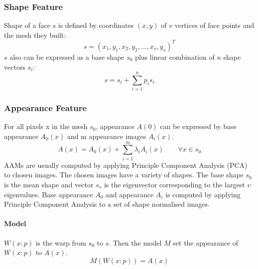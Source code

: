 \subsubsection{Shape Feature}
Shape of a face $s$ is defined by coordinates $(x,y)$ of $v$ vertices of face points and the mesh they built:
\begin{equation}
s = (x_{1},y_{1},x_{2},y_{2},...,x_{v},y_{v})^{T}
\end{equation}
\newline
$s$ also can be expressed as a base shape $s_{0}$ plus linear combination of $n$ shape vectors $s_{i}$:
\begin{equation}
s = s_{i} + \sum_{i =1}^{n}p_{i}s_{i}
\end{equation}
\subsubsection{Appearance Feature}
For all pixels x in the mesh $s_{0}$, appearance $A(0)$ can be expressed by base appearance $A_{0}(x)$ and m appearance images $A_{i}(x)$.
\begin{equation}
A(x) = A_{0}(x) + \sum_{i=1}^{m}\lambda_{i}A_{i}(x) \qquad \forall x \in s_{0}
\end{equation}
\newline
AAMs are usually computed by applying Principle Component Analysis (PCA) to chosen images. The chosen images have a variety of shapes. The base shape $s_{0}$ is the mean shape and vector $s_{v}$ is the eigenvector corresponding to the largest $v$ eigenvalues. Base appearance $A_{0}$ and appearance $A_{i}$ is computed by applying Principle Component Analysis to a set of shape normalised images.
\paragraph{Model} 
$W(x:p)$ is the warp from $s_{0}$ to $s$. Then the model $M$ set the appearance of $W(x:p)$ to $A(x)$.
\begin{equation}
M(W(x:p)) = A(x)
\end{equation}
